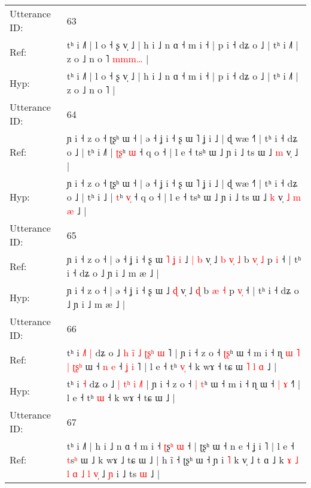 \documentclass[10pt]{article}
\DeclareRobustCommand{\hl}[1]{{\textcolor{red}{#1}}}
\begin{document}
\begin{longtable}{ll}
 \\
\midrule
Utterance ID: & 63 \\
Ref: & tʰ i ˩˥ | l o ˧ ʂ v̩ ˩ | h i ˩ n ɑ ˧ m i ˧ | p i ˧ dʑ o ˩ | tʰ i ˩˥ | z o ˩ n o ˥\hl{ }\hl{m}\hl{m}\hl{m}\hl{…} |
 \\
Hyp: & tʰ i ˩˥ | l o ˧ ʂ v̩ ˩ | h i ˩ n ɑ ˧ m i ˧ | p i ˧ dʑ o ˩ | tʰ i ˩˥ | z o ˩ n o ˥\hl{}\hl{}\hl{}\hl{}\hl{} |
 \\
\midrule
Utterance ID: & 64 \\
Ref: & ɲ i ˧ z o ˧ ʈʂʰ ɯ ˧ | ə ˧ ʝ i ˧ ʂ ɯ ˥ ʝ i ˩ | ɖ wæ ˧˥ | tʰ i ˧ dʑ o ˩ | tʰ i ˩\hl{˥} | \hl{ʈ}\hl{ʂ}ʰ \hl{}\hl{ɯ} ˧ q o ˧ | l e ˧ tsʰ ɯ ˩ ɲ i ˩ ts ɯ ˩ \hl{m} v̩\hl{}\hl{}\hl{}\hl{}\hl{}\hl{} ˩ |
 \\
Hyp: & ɲ i ˧ z o ˧ ʈʂʰ ɯ ˧ | ə ˧ ʝ i ˧ ʂ ɯ ˥ ʝ i ˩ | ɖ wæ ˧˥ | tʰ i ˧ dʑ o ˩ | tʰ i ˩\hl{} | \hl{}\hl{t}ʰ \hl{v}\hl{̩} ˧ q o ˧ | l e ˧ tsʰ ɯ ˩ ɲ i ˩ ts ɯ ˩ \hl{k} v̩\hl{ }\hl{˩}\hl{ }\hl{m}\hl{ }\hl{æ} ˩ |
 \\
\midrule
Utterance ID: & 65 \\
Ref: & ɲ i ˧ z o ˧ | ə ˧ ʝ i ˧ ʂ ɯ\hl{ }\hl{˥}\hl{ }\hl{ʝ}\hl{ }\hl{i} ˩\hl{ }\hl{|} \hl{b} v̩ ˩\hl{ }\hl{b}\hl{ }\hl{v}\hl{̩} \hl{˩} b \hl{v}\hl{̩} \hl{˩} p \hl{}\hl{i} ˧ | tʰ i ˧ dʑ o ˩ ɲ i ˩ m æ ˩ |
 \\
Hyp: & ɲ i ˧ z o ˧ | ə ˧ ʝ i ˧ ʂ ɯ\hl{}\hl{}\hl{}\hl{}\hl{}\hl{} ˩\hl{}\hl{} \hl{ɖ} v̩ ˩\hl{}\hl{}\hl{}\hl{}\hl{} \hl{ɖ} b \hl{}\hl{æ} \hl{˧} p \hl{v}\hl{̩} ˧ | tʰ i ˧ dʑ o ˩ ɲ i ˩ m æ ˩ |
 \\
\midrule
Utterance ID: & 66 \\
Ref: & tʰ i\hl{ }\hl{˩}\hl{˥} \hl{|} dʑ o ˩ \hl{h} \hl{i}\hl{̃}\hl{ }\hl{˩} \hl{ʈ}\hl{ʂ}\hl{ʰ} \hl{ɯ}\hl{ }˥ | ɲ i ˧ z o ˧ \hl{}\hl{ʈ}\hl{ʂ}ʰ ɯ ˧ m i ˧ ɳ\hl{ }\hl{ɯ}\hl{ }\hl{˥}\hl{ }\hl{|}\hl{ }\hl{ʈ}\hl{ʂ}\hl{ʰ} ɯ ˧ \hl{n} \hl{e} ˧\hl{ }\hl{ʝ}\hl{ }\hl{i}\hl{ }˥ | l e ˧ tʰ \hl{v}\hl{̩} ˧ k wɤ ˧ tɕ ɯ\hl{ }\hl{˥}\hl{ }\hl{l}\hl{ }\hl{ɑ} ˩ |
 \\
Hyp: & tʰ i\hl{}\hl{}\hl{} \hl{˧} dʑ o ˩ \hl{|} \hl{}\hl{}\hl{t}\hl{ʰ} \hl{}\hl{}\hl{i} \hl{}\hl{˩}˥ | ɲ i ˧ z o ˧ \hl{|}\hl{ }\hl{t}ʰ ɯ ˧ m i ˧ ɳ\hl{}\hl{}\hl{}\hl{}\hl{}\hl{}\hl{}\hl{}\hl{}\hl{} ɯ ˧ \hl{|} \hl{ɤ} ˧\hl{}\hl{}\hl{}\hl{}\hl{}˥ | l e ˧ tʰ \hl{}\hl{ɯ} ˧ k wɤ ˧ tɕ ɯ\hl{}\hl{}\hl{}\hl{}\hl{}\hl{} ˩ |
 \\
\midrule
Utterance ID: & 67 \\
Ref: & tʰ i ˩˥ | h i ˩ n ɑ ˧ m i ˧ \hl{ʈ}ʂ\hl{ʰ} \hl{ɯ} ˧ | ʈʂʰ ɯ ˧ n e ˧ ʝ i ˥ | l e ˧ \hl{t}s\hl{ʰ} ɯ ˩ k wɤ ˩ tɕ ɯ ˩ | h ĩ ˧\hl{}\hl{} ʈʂʰ ɯ ˧ ɲ i \hl{˥} k v̩ ˩ t ɑ ˩ k\hl{ }\hl{ɤ}\hl{ }\hl{˩}\hl{ }\hl{l}\hl{ }\hl{ɑ}\hl{ }\hl{˩}\hl{ }\hl{l} \hl{v}\hl{̩} ˩ \hl{ɲ} i ˩ ts \hl{ɯ} ˩ |

\end{longtable}
\end{document}
